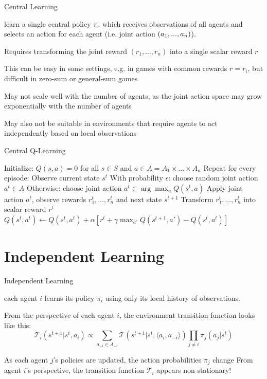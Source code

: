 \begin{frame}{Central Learning}

 learn a single central policy $\pi_c$ which receives observations of all agents and selects an action for each agent (i.e. joint action $(a_1,...,a_n)$). 

\blist
    \item<1-> Requires transforming the joint reward $(r_1, \ldots, r_n)$ into a single scalar reward $r$
    \item<2-> This can be easy in some settings, e.g. in games with common rewards $r = r_i$, but difficult in zero-sum or general-sum games
    \item<3-> May not scale well with the number of agents, as the joint action space may grow exponentially with the number of agents
    \item<4-> May also not be suitable in environments that require agents to act independently based on local observations
\elist
\end{frame}

\begin{frame}{Central Q-Learning}


\State Initialize: \( Q(s, a) = 0 \) for all \( s \in S \) and \( a \in A = A_1 \times \ldots \times A_n \)
\State Repeat for every episode:
    \State Observe current state \( s^t \)
    \State With probability \( \epsilon \): choose random joint action \( a^t \in A \)
    \State Otherwise: choose joint action \( a^t \in \arg\max_a Q(s^t, a) \)
    \State Apply joint action \( a^t \), observe rewards \( r_1^t, \ldots, r_n^t \) and next state \( s^{t+1} \)
    \State Transform \( r_1^t, \ldots, r_n^t \) into scalar reward \( r^t \)
    \State \( Q(s^t, a^t) \leftarrow Q(s^t, a^t) + \alpha [ r^t + \gamma \max_{a'} Q(s^{t+1}, a') - Q(s^t, a^t) ] \)
\EndFor
\ealg

\end{frame}

\section{Independent Learning}

\begin{frame}{Independent Learning}

 each agent $i$ learns its policy $\pi_i$ using only its local history of observations.

\blist
    \item From the perspective of each agent $i$, the environment transition function looks like this:
\elist
\[
\mathcal{T}_i(s^{t+1} | s^t, a_i) \propto \sum_{a_{-i} \in A_{-i}} \mathcal{T}(s^{t+1} | s^t, \langle a_i, a_{-i} \rangle) \prod_{j \neq i} \pi_j(a_j | s^t)
\]
\blist
    \item As each agent $j$'s policies are updated, the action probabilities $\pi_j$ change
    \listtab From agent $i$'s perspective, the transition function $\mathcal{T}_i$ appears non-stationary!
\elist
    
\end{frame}

